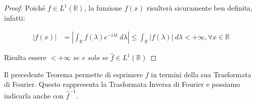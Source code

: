 \begin{proof}
    Poiché $f \in L^1(\mathbb{R})$, la funzione $f(x)$ risulterà
    sicuramente ben definita, infatti:

    \begin{equation}
        \begin{aligned}
            |f(x)| & = \left|\int_{\mathbb{R}} f(\lambda) e^{-i \lambda t} \ d\lambda \right| \leq \int_{\mathbb{R}} |f(\lambda)| \ d\lambda < + \infty, \forall x \in \mathbb{R}
        \end{aligned}
    \end{equation}

    Risulta essere $< +\infty$ \textit{se e solo se} $\hat{f}\in L^1(\mathbb{R})$

\end{proof}

Il precedente Teorema permette di esprimere $f$ in termini della sua Trasformata
di Fourier. Questo rappresenta la Trasformata Inversa di Fourier e possiamo
indicarla anche con $\hat{f}^{-1}$.


